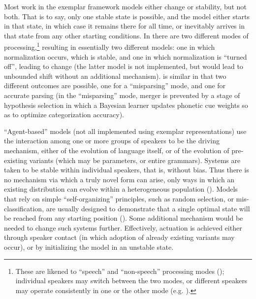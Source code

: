 Most work in the exemplar framework models either change or stability,
but not both. That is to say, only one stable state is possible, and
the model either starts in that state, in which case it remains there
for all time, or inevitably arrives in that state from any other starting
conditions. In \citet{Garrett2013} there are two different modes
of processing,\footnote{These are likened to “speech” and “non-speech” processing
modes (\citealt{liberman1967perception}); individual speakers may
switch between the two modes, or different speakers may operate consistently
in one or the other mode (e.g. \citealt{yu2013socio}). } resulting in essentially two different models: one in which normalization
occurs, which is stable, and one in which normalization is “turned
off”, leading to change (the latter model is not implemented, but
would lead to unbounded shift without an additional mechanism). \citet{Kirby2014}
is similar in that two different outcomes are possible, one for a
``misparsing'' mode, and one for accurate parsing (in the ``misparsing''
mode, merger is prevented by a stage of hypothesis selection in which
a Bayesian learner updates phonetic cue weights so as to optimize
categorization accuracy). 

“Agent-based” models (not all implemented using exemplar representations)
use the interaction among one or more groups of speakers to be the
driving mechanism, either of the evolution of language itself, or
of the evolution of pre-existing variants (which may be parameters,
or entire grammars). Systems are taken to be stable within individual
speakers, that is, without bias. Thus there is no mechanism via which
a truly novel form can arise, only ways in which an existing distribution
can evolve within a heterogeneous population (\citealt{Niyogi1997,Boer2000,nowak2001evolution,Steels2005,baxter2006utterance,oudeyer2006self,fagyal2010centers,stanford2013revisiting,pierrehumbert2014model}).
Models that rely on simple ``self-organizing'' principles, such as random
selection, or mis-classification, are usually designed to demonstrate
that a single optimal state will be reached from any starting position
(\citealp{Wedela,ettlinger2007exemplar,Wedel2006,Blevins2009,DBLP:journals/corr/Tupper14a,wedel2017category}).
Some additional mechanism would be needed to change such systems further.
Effectively, actuation is achieved either through speaker contact
(in which adoption of already existing variants may occur), or by
initializing the model in an unstable state. 


